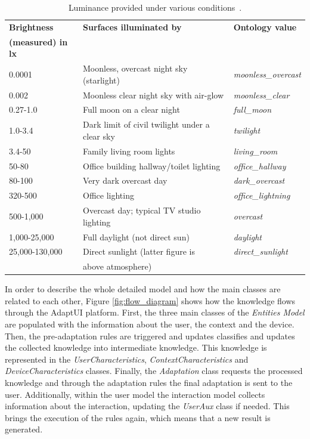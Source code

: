 \begin{table}
  \caption{Luminance provided under various conditions~\citep{luminance}.}
 \label{tbl:luminance}
\footnotesize
\centering
 \begin{tabular}{l l l}
  \hline 
  \textbf{Brightness} & \textbf{Surfaces illuminated by}		& \textbf{Ontology value}	\\
  \textbf{(measured) in \ac{lx}}&					&				\\
  \hline
  0.0001		& Moonless, overcast night sky (starlight)	& \textit{moonless\_overcast}	\\
  0.002 		& Moonless clear night sky with air-glow	& \textit{moonless\_clear}	\\
  0.27-1.0		& Full moon on a clear night			& \textit{full\_moon}		\\
  1.0-3.4		& Dark limit of civil twilight under a clear sky& \textit{twilight}		\\
  3.4-50		& Family living room lights			& \textit{living\_room}		\\
  50-80 		& Office building hallway/toilet lighting	& \textit{office\_hallway}	\\
  80-100		& Very dark overcast day			& \textit{dark\_overcast}	\\
  320-500		& Office lighting				& \textit{office\_lightning}	\\
  500-1,000		& Overcast day; typical TV studio lighting	& \textit{overcast}		\\
  1,000-25,000		& Full daylight (not direct sun)		& \textit{daylight}		\\
  25,000-130,000	& Direct sunlight (latter figure is 		& \textit{direct\_sunlight}	\\
			& above atmosphere)				& 				\\
  \hline

\end{tabular}
\end{table}


In order to describe the whole detailed model and how the main classes are related
to each other, Figure \ref{fig:flow_diagram} shows how the knowledge flows through
the AdaptUI platform. First, the three main classes of the \textit{Entities Model}
are populated with the information about the user, the context and the device.
Then, the pre-adaptation rules are triggered and updates classifies and updates
the collected knowledge into intermediate knowledge. This knowledge is represented
in the \textit{UserCharacteristics}, \textit{ContextCharacteristics} and
\textit{DeviceCharacteristics} classes. Finally, the \textit{Adaptation} class
requests the processed knowledge and through the adaptation rules the final
adaptation is sent to the user. Additionally, within the user model the interaction
model collects information about the interaction, updating the \textit{UserAux}
class if needed. This brings the execution of the rules again, which means that
a new result is generated.


